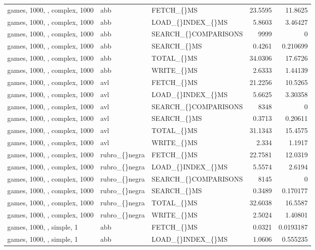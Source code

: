 \begin{longtable}{p{4cm}p{1.4cm}p{2.6cm}rr}
games, 1000, , complex, 1000 & abb & FETCH\_\allowbreak\{\}MS & 23.5595 & 11.8625\\
games, 1000, , complex, 1000 & abb & LOAD\_\allowbreak\{\}INDEX\_\allowbreak\{\}MS & 5.8603 & 3.46427\\
games, 1000, , complex, 1000 & abb & SEARCH\_\allowbreak\{\}COMPARISONS & 9999 & 0\\
games, 1000, , complex, 1000 & abb & SEARCH\_\allowbreak\{\}MS & 0.4261 & 0.210699\\
games, 1000, , complex, 1000 & abb & TOTAL\_\allowbreak\{\}MS & 34.0306 & 17.6726\\
games, 1000, , complex, 1000 & abb & WRITE\_\allowbreak\{\}MS & 2.6333 & 1.44139\\
games, 1000, , complex, 1000 & avl & FETCH\_\allowbreak\{\}MS & 21.2256 & 10.5265\\
games, 1000, , complex, 1000 & avl & LOAD\_\allowbreak\{\}INDEX\_\allowbreak\{\}MS & 5.6625 & 3.30358\\
games, 1000, , complex, 1000 & avl & SEARCH\_\allowbreak\{\}COMPARISONS & 8348 & 0\\
games, 1000, , complex, 1000 & avl & SEARCH\_\allowbreak\{\}MS & 0.3713 & 0.20611\\
games, 1000, , complex, 1000 & avl & TOTAL\_\allowbreak\{\}MS & 31.1343 & 15.4575\\
games, 1000, , complex, 1000 & avl & WRITE\_\allowbreak\{\}MS & 2.334 & 1.1917\\
games, 1000, , complex, 1000 & rubro\_\allowbreak\{\}negra & FETCH\_\allowbreak\{\}MS & 22.7581 & 12.0319\\
games, 1000, , complex, 1000 & rubro\_\allowbreak\{\}negra & LOAD\_\allowbreak\{\}INDEX\_\allowbreak\{\}MS & 5.5574 & 2.6194\\
games, 1000, , complex, 1000 & rubro\_\allowbreak\{\}negra & SEARCH\_\allowbreak\{\}COMPARISONS & 8145 & 0\\
games, 1000, , complex, 1000 & rubro\_\allowbreak\{\}negra & SEARCH\_\allowbreak\{\}MS & 0.3489 & 0.170177\\
games, 1000, , complex, 1000 & rubro\_\allowbreak\{\}negra & TOTAL\_\allowbreak\{\}MS & 32.6038 & 16.5587\\
games, 1000, , complex, 1000 & rubro\_\allowbreak\{\}negra & WRITE\_\allowbreak\{\}MS & 2.5024 & 1.40801\\
games, 1000, , simple, 1 & abb & FETCH\_\allowbreak\{\}MS & 0.0321 & 0.0193187\\
games, 1000, , simple, 1 & abb & LOAD\_\allowbreak\{\}INDEX\_\allowbreak\{\}MS & 1.0606 & 0.555235\\

\end{longtable}
